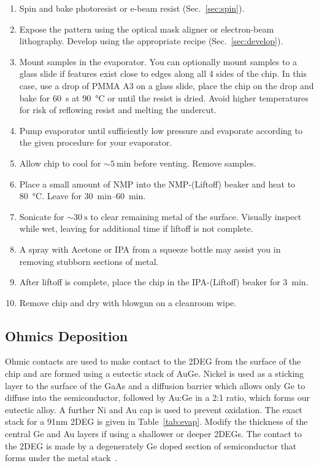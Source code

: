 
\begin{enumerate}
    \item Spin and bake photoresist or e-beam resist (Sec.~\ref{sec:spin}).
    \item Expose the pattern using the optical mask aligner or electron-beam lithography. Develop using the appropriate recipe (Sec.~\ref{sec:develop}).
    \item Mount samples in the evaporator. You can optionally mount samples to a glass slide if features exist close to edges along all 4 sides of the chip. In this case, use a drop of PMMA A3 on a glass slide, place the chip on the drop and bake for \SI{60}{\second} at \SI{90}{\celsius} or until the resist is dried. Avoid higher temperatures for risk of reflowing resist and melting the undercut.
    \item Pump evaporator until sufficiently low pressure and evaporate according to the given procedure for your evaporator.
    \item Allow chip to cool for $\sim \SI{5}{\minute}$ before venting. Remove samples.
    \item Place a small amount of NMP into the NMP-(Liftoff) beaker and heat to \SI{80}{\celsius}. Leave for \SIrange{30}{60}{\minute}.
    \item Sonicate for $\sim \SI{30}{\second}$ to clear remaining metal of the surface. Visually inspect while wet, leaving for additional time if liftoff is not complete.
    \item A spray with Acetone or IPA from a squeeze bottle may assist you in removing stubborn sections of metal.
    \item After liftoff is complete, place the chip in the IPA-(Liftoff) beaker for \SI{3}{\minute}.
    \item Remove chip and dry with  blowgun on a cleanroom wipe.
\end{enumerate}

\subsection{Ohmics Deposition}
\label{sec:ohmics}
Ohmic contacts are used to make contact to the 2DEG from the surface of the chip and are formed using a eutectic stack
of AuGe. Nickel is used as a sticking layer to the surface of the GaAs and a diffusion barrier which allows only Ge to diffuse
into the semiconductor, followed by Au:Ge in a 2:1 ratio, which forms our eutectic alloy. A further Ni and Au cap is used to
prevent oxidation. The exact stack for a 91nm 2DEG is given in Table~\ref{tab:evap}. Modify the thickness of the central Ge and
Au layers if using a shallower or deeper 2DEGs. The contact to the 2DEG is made by a degenerately
Ge doped section of semiconductor that forms under the metal stack~\cite{RELLING1989380,PIOTROWSKA1983179}.

